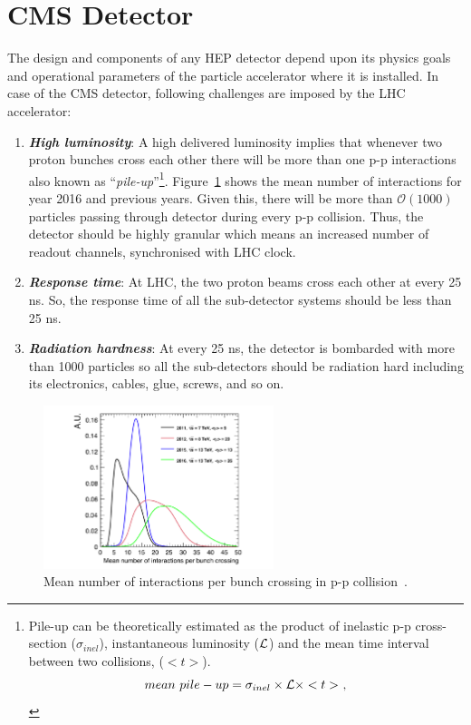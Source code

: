 \section{CMS Detector} %
\label{sec:cms_experiment}
The design and components of any HEP detector depend upon its physics goals and operational parameters of the particle accelerator where it is installed. In case of the CMS detector, following challenges are imposed by the LHC accelerator:
\begin{enumerate}
	\item \textbf{ \textit{High luminosity}}: A high delivered luminosity implies that whenever two proton bunches cross each other there will be more than one p-p interactions also known as ``\textit{pile-up}''\footnote{Pile-up can be theoretically estimated as the product of inelastic p-p cross-section ($\sigma_{inel}$), instantaneous luminosity ($\mathcal{L}$) and the mean time interval between two collisions, ($< t >$). \begin{equation}
		mean~pile-up = \sigma_{inel} \times \mathcal{L} \times <t>~,
	\end{equation}}. Figure~\ref{fig:pile-up} shows the mean number of interactions for year 2016 and previous years. Given this, there will be more than $\mathcal{O}(1000)$ particles passing through detector during every p-p collision. Thus, the detector should be highly granular which means an increased number of readout channels, synchronised with LHC clock.
	\item \textbf{\textit{Response time}}: At LHC, the two proton beams cross each other at every 25 ns. So, the response time of all the sub-detector systems should be less than 25 ns.
	\item \textbf{\textit{Radiation hardness}}: At every 25 ns, the detector is bombarded with more than 1000 particles so all the sub-detectors should be radiation hard including its electronics, cables, glue, screws, and so on.
\end{enumerate}
\begin{figure}[!htbp]
	\centering
	\includegraphics[width=0.60\textwidth]{figures/LHC/pileup.pdf}
	\caption{Mean number of interactions per bunch crossing in p-p collision~\cite{Apyan2017}.}
	\label{fig:pile-up}
\end{figure}
